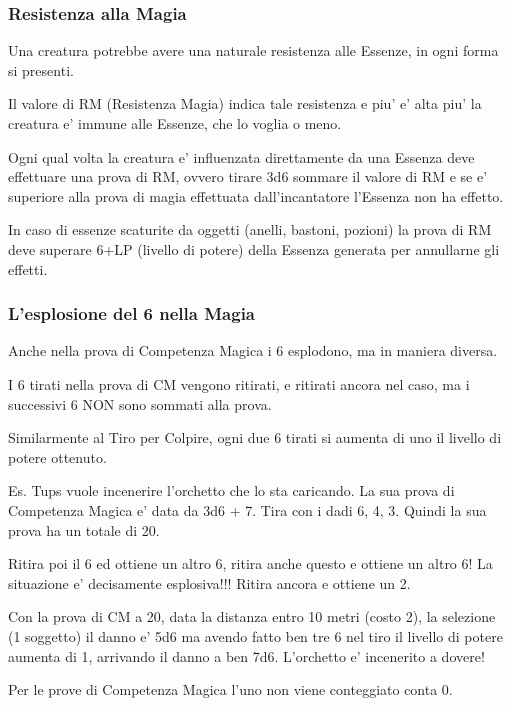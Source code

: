 \documentclass[a4paper,11pt,twoside,openany]{book}
\begin{document}
	\subsubsection{Resistenza alla Magia}
	
	Una creatura potrebbe avere una naturale resistenza alle Essenze, in ogni forma si presenti.
	
	Il valore di RM (Resistenza Magia) indica tale resistenza e piu' e' alta piu' la creatura e' immune alle Essenze, che lo voglia o meno.
	
	Ogni qual volta la creatura e' influenzata direttamente da una Essenza deve effettuare una prova di RM, ovvero tirare 3d6 sommare il valore di RM e se e' superiore alla prova di magia effettuata dall'incantatore l'Essenza non ha effetto.
	
	In caso di essenze scaturite da oggetti (anelli, bastoni, pozioni)
	la prova di RM deve superare 6+LP (livello di potere) della Essenza
	generata per annullarne gli effetti.
	
	\subsubsection{L'esplosione del 6 nella Magia}
	
	\label{lesplosione-del-6-nella-magia}
	
	Anche nella prova di Competenza Magica i 6 esplodono, ma in maniera diversa.
	
	I 6 tirati nella prova di CM vengono ritirati, e ritirati ancora nel caso, ma i successivi 6 NON sono sommati alla prova.
	
	Similarmente al Tiro per Colpire, ogni due 6 tirati si aumenta di uno il livello di potere ottenuto.
	
	Es. Tups vuole incenerire l'orchetto che lo sta caricando. La sua prova di Competenza Magica e' data da 3d6 + 7. Tira con i dadi 6, 4, 3. Quindi la sua prova ha un totale di 20.
	
	Ritira poi il 6 ed ottiene un altro 6, ritira anche questo e ottiene un altro 6! La situazione e' decisamente esplosiva!!! Ritira ancora e ottiene un 2.
	
	Con la prova di CM a 20, data la distanza entro 10 metri (costo 2), la selezione (1 soggetto) il danno e' 5d6 ma avendo fatto ben tre 6 nel tiro il livello di potere aumenta di 1, arrivando il danno a ben 7d6. L'orchetto e' incenerito a dovere!
	
	Per le prove di Competenza Magica l'uno non viene conteggiato conta 0.
	
\end{document}

